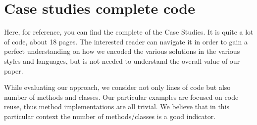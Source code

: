 \section{Case studies complete code} 

Here, for reference, you can find the complete
of the Case Studies.
It is quite a lot of code, about 18 pages. The interested reader
can navigate it in order to gain a perfect understanding on
how we encoded the various solutions in the various styles and languages,
but is not needed to understand the overall value of our paper.

While evaluating our approach, we consider not only lines of code but also number of methods and classes.
Our particular examples are focused on code reuse, thus method implementations are all trivial.
We believe that in this particular context the number of methods/classes is a good indicator.


